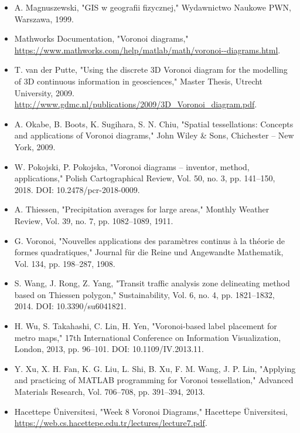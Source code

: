 \documentclass[12pt,a4paper]{report}
\begin{document}
\begin{itemize}
  \item A. Magnuszewski, "GIS w geografii fizycznej," Wydawnictwo Naukowe PWN, Warszawa, 1999.
  
  \item Mathworks Documentation, "Voronoi diagrams," \url{https://www.mathworks.com/help/matlab/math/voronoi--diagrams.html}.
  
  \item T. van der Putte, "Using the discrete 3D Voronoi diagram for the modelling of 3D continuous information in geosciences," Master Thesis, Utrecht University, 2009. \url{http://www.gdmc.nl/publications/2009/3D_Voronoi_diagram.pdf}.
  
  \item A. Okabe, B. Boots, K. Sugihara, S. N. Chiu, "Spatial tessellations: Concepts and applications of Voronoi diagrams," John Wiley \& Sons, Chichester – New York, 2009.
  
  \item W. Pokojski, P. Pokojska, "Voronoi diagrams – inventor, method, applications," Polish Cartographical Review, Vol. 50, no. 3, pp. 141–150, 2018. DOI: 10.2478/pcr-2018-0009.
  
  \item A. Thiessen, "Precipitation averages for large areas," Monthly Weather Review, Vol. 39, no. 7, pp. 1082–1089, 1911.
  
  \item G. Voronoi, "Nouvelles applications des paramètres continus à la théorie de formes quadratiques," Journal für die Reine und Angewandte Mathematik, Vol. 134, pp. 198–287, 1908.
  
  \item S. Wang, J. Rong, Z. Yang, "Transit traffic analysis zone delineating method based on Thiessen polygon," Sustainability, Vol. 6, no. 4, pp. 1821–1832, 2014. DOI: 10.3390/su6041821.
  
  \item H. Wu, S. Takahashi, C. Lin, H. Yen, "Voronoi-based label placement for metro maps," 17th International Conference on Information Visualization, London, 2013, pp. 96–101. DOI: 10.1109/IV.2013.11.
  
  \item Y. Xu, X. H. Fan, K. G. Liu, L. Shi, B. Xu, F. M. Wang, J. P. Lin, "Applying and practicing of MATLAB programming for Voronoi tessellation," Advanced Materials Research, Vol. 706–708, pp. 391–394, 2013.
  
  \item Hacettepe Üniversitesi, "Week 8 Voronoi Diagrams," Hacettepe Üniversitesi, \url{https://web.cs.hacettepe.edu.tr/lectures/lecture7.pdf}.
  

\end{itemize}
\end{document}

